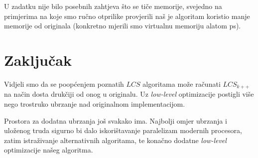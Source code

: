 \documentclass[times, utf8, seminar, numeric]{fer}
\begin{document}
U zadatku nije bilo posebnih zahtjeva što se tiče memorije, svejedno
na primjerima na koje smo ručno otprilike provjerili naš je
algoritam koristio manje memorije od originala (konkretno mjerili
smo virtualnu memoriju alatom ps).

\chapter{Zaključak}
Vidjeli smo da se poopćenjem poznatih $LCS$ algoritama može 
računati $LCS_{k++}$ na način dosta drukčiji od onog u originalu.
Uz \emph{low-level} optimizacije postigli više nego trostruko ubrzanje
nad originalnom implementacijom.

Prostora za dodatna ubrzanja još svakako ima. Najbolji omjer ubrzanja
i uloženog truda sigurno bi dalo iskorištavanje paralelizam modernih
procesora, zatim istraživanje alternativnih algoritama, te konačno
dodatne \emph{low-level} optimizacije našeg algoritma.



\end{document}
